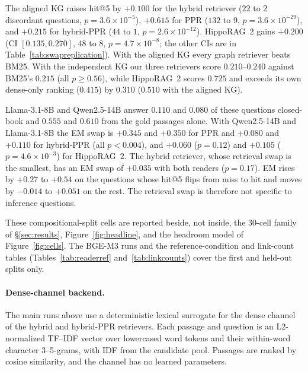 \documentclass[11pt]{article}
\begin{document}
The aligned KG raises hit@5 by $+0.100$ for the hybrid retriever ($22$ to $2$ discordant questions, $p=3.6\times10^{-5}$), $+0.615$ for PPR ($132$ to $9$, $p=3.6\times10^{-29}$), and $+0.215$ for hybrid-PPR ($44$ to $1$, $p=2.6\times10^{-12}$). HippoRAG~2 gains $+0.200$ (CI $[0.135,0.270]$, $48$ to $8$, $p=4.7\times10^{-8}$; the other CIs are in Table~\ref{tab:swapreplication}). With the aligned KG every graph retriever beats BM25. With the independent KG our three retrievers score $0.210$--$0.240$ against BM25's $0.215$ (all $p\geq0.56$), while HippoRAG~2 scores $0.725$ and exceeds its own dense-only ranking ($0.415$) by $0.310$ ($0.510$ with the aligned KG).

Llama-3.1-8B and Qwen2.5-14B answer $0.110$ and $0.080$ of these questions closed-book and $0.555$ and $0.610$ from the gold passages alone. With Qwen2.5-14B and Llama-3.1-8B the EM swap is $+0.345$ and $+0.350$ for PPR and $+0.080$ and $+0.110$ for hybrid-PPR (all $p<0.004$), and $+0.060$ ($p=0.12$) and $+0.105$ ($p=4.6\times10^{-3}$) for HippoRAG~2. The hybrid retriever, whose retrieval swap is the smallest, has an EM swap of $+0.035$ with both readers ($p=0.17$). EM rises by $+0.27$ to $+0.54$ on the questions whose hit@5 flips from miss to hit and moves by $-0.014$ to $+0.051$ on the rest. The retrieval swap is therefore not specific to inference questions.

These compositional-split cells are reported beside, not inside, the $30$-cell family of \S\ref{sec:results}, Figure~\ref{fig:headline}, and the headroom model of Figure~\ref{fig:cells}. The BGE-M3 runs and the reference-condition and link-count tables (Tables~\ref{tab:readerref} and~\ref{tab:linkcounts}) cover the first and held-out splits only.

\paragraph{Dense-channel backend.} The main runs above use a deterministic lexical surrogate for the dense channel of the hybrid and hybrid-PPR retrievers. Each passage and question is an L2-normalized TF--IDF vector over lowercased word tokens and their within-word character 3--5-grams, with IDF from the candidate pool. Passages are ranked by cosine similarity, and the channel has no learned parameters.
\end{document}
